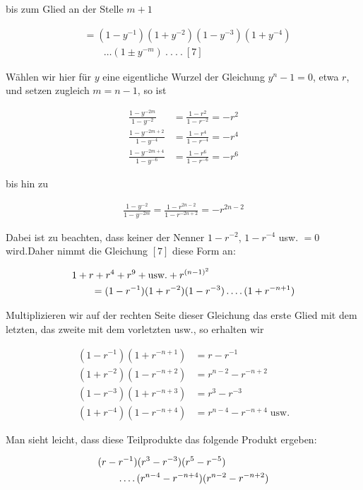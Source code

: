 bis zum Glied an der Stelle $m+1$

\[
\begin{aligned}
&=(1-y^{-1})(1+y^{-2})(1-y^{-3})(1+y^{-4})\\&\qquad\ldots(1\pm y^{-m})\  .\  .\  .\  .\ [7]
\end{aligned}
\]

Wählen wir hier für $y$ eine eigentliche Wurzel der Gleichung $y^n-1=0$, etwa $r$, und setzen zugleich $m=n-1$, so ist

\[
\begin{aligned}
\frac{1-y^{-2m}}{1-y^{-2}}&=\frac{1-r^2}{1-r^{-2}}=-r^2\\
\frac{1-y^{-2m+2}}{1-y^{-4}}&=\frac{1-r^4}{1-r^{-4}}=-r^4\\
\frac{1-y^{-2m+4}}{1-y^{-6}}&=\frac{1-r^6}{1-r^{-6}}=-r^6
\end{aligned}
\]

bis hin zu

\[
\begin{aligned}
\frac{1-y^{-2}}{1-y^{-2m}}=\frac{1-r^{2n-2}}{1-r^{-2n+2}}=-r^{2n-2}
\end{aligned}
\]

Dabei ist zu beachten, dass keiner der Nenner $1-r^{-2}$, $1-r^{-4}$ usw. $=0$ wird.\quad Daher nimmt die Gleichung $[7]$ diese Form an:

\[
\begin{aligned}
&1+r+r^4+r^9+\text{usw.}+r^{(n-1)^2}\\&\qquad=(1-r^{-1})(1+r^{-2})(1-r^{-3})\mathinner{.\,.\,.\,.}(1+r^{-n+1})
\end{aligned}
\]

Multiplizieren wir auf der rechten Seite dieser Gleichung das erste Glied mit dem letzten, das zweite mit dem vorletzten usw., so erhalten wir

\[
\begin{aligned}
(1-r^{-1})(1+r^{-n+1})&=r-r^{-1}\\
(1+r^{-2})(1-r^{-n+2})&=r^{n-2}-r^{-n+2}\\
(1-r^{-3})(1+r^{-n+3})&=r^3-r^{-3}\\
(1+r^{-4})(1-r^{-n+4})&=r^{n-4}-r^{-n+4}\;\text{usw.}
\end{aligned}
\]

Man sieht leicht, dass diese Teilprodukte das folgende Produkt ergeben:

\[
\begin{aligned}
&(r-r^{-1})(r^3-r^{-3})(r^5-r^{-5})\\&\qquad\mathinner{.\,.\,.\,.}(r^{n-4}-r^{-n+4})(r^{n-2}-r^{-n+2})
\end{aligned}
\]

